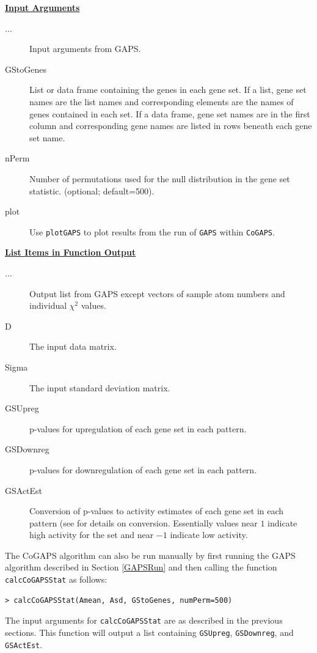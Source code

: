 \documentclass{report}
\begin{document}
\par \noindent \textbf{\underline{Input Arguments}}
\begin{description}
\item[$\ldots$]{Input arguments from GAPS.}
\item[GStoGenes]{List or data frame containing the genes in each gene set. If a list, gene set names are the list names and corresponding elements are the names of genes contained in each set. If a data frame, gene set names are in the first column and corresponding gene names are listed in rows beneath each gene set name.}
\item[nPerm]{Number of permutations used for the null distribution in the gene set statistic. (optional; default=500).}
\item[plot]{Use \texttt{plotGAPS} to plot results from the run of \texttt{GAPS} within \texttt{CoGAPS}.}
\end{description}

\par \noindent \textbf{\underline{List Items in Function Output}}
\begin{description}
\item[$\ldots$]{Output list from GAPS except vectors of sample atom numbers and individual $\chi^2$ values.}
\item[D]{The input data matrix.}
\item[Sigma]{The input standard deviation matrix.}
\item[GSUpreg]{p-values for upregulation of each gene set in each pattern.}
\item[GSDownreg]{p-values for downregulation of each gene set in each pattern.}
\item[GSActEst]{Conversion of p-values to activity estimates of each gene set in each pattern (see \cite{Ochs2009} for details on conversion.  Essentially values near $1$ indicate high activity for the set and near $-1$ indicate low activity.}
\end{description}

\par The CoGAPS algorithm can also be run manually by first running the GAPS algorithm described in Section \ref{GAPSRun} and then calling the function \texttt{calcCoGAPSStat} as follows:
\begin{verbatim}
> calcCoGAPSStat(Amean, Asd, GStoGenes, numPerm=500)
\end{verbatim}
The input arguments for \texttt{calcCoGAPSStat} are as described in the previous sections.  This function will output a list containing \texttt{GSUpreg}, \texttt{GSDownreg}, and \texttt{GSActEst}.
\end{document}
